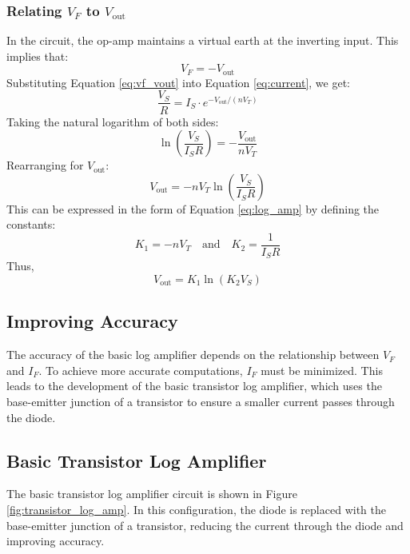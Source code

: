 \subsubsection{Relating \(V_F\) to \(V_{\text{out}}\)}
In the circuit, the op-amp maintains a virtual earth at the inverting input. This implies that:
\begin{equation}
V_F = -V_{\text{out}}
\label{eq:vf_vout}
\end{equation}
Substituting Equation \ref{eq:vf_vout} into Equation \ref{eq:current}, we get:
\begin{equation}
\frac{V_S}{R} = I_S \cdot e^{-V_{\text{out}}/(nV_T)}
\label{eq:final}
\end{equation}
Taking the natural logarithm of both sides:
\begin{equation}
\ln\left(\frac{V_S}{I_S R}\right) = -\frac{V_{\text{out}}}{nV_T}
\label{eq:log_relation}
\end{equation}
Rearranging for \(V_{\text{out}}\):
\begin{equation}
V_{\text{out}} = -nV_T \ln\left(\frac{V_S}{I_S R}\right)
\label{eq:vout_final}
\end{equation}
This can be expressed in the form of Equation \ref{eq:log_amp} by defining the constants:
\begin{equation}
K_1 = -nV_T \quad \text{and} \quad K_2 = \frac{1}{I_S R}
\end{equation}
Thus,
\begin{equation}
V_{\text{out}} = K_1 \ln(K_2 V_S)
\label{eq:general_log_amp}
\end{equation}

\subsection{Improving Accuracy}
The accuracy of the basic log amplifier depends on the relationship between \(V_F\) and \(I_F\). To achieve more accurate computations, \(I_F\) must be minimized. This leads to the development of the basic transistor log amplifier, which uses the base-emitter junction of a transistor to ensure a smaller current passes through the diode.

\subsection{Basic Transistor Log Amplifier}
The basic transistor log amplifier circuit is shown in Figure \ref{fig:transistor_log_amp}. In this configuration, the diode is replaced with the base-emitter junction of a transistor, reducing the current through the diode and improving accuracy.

